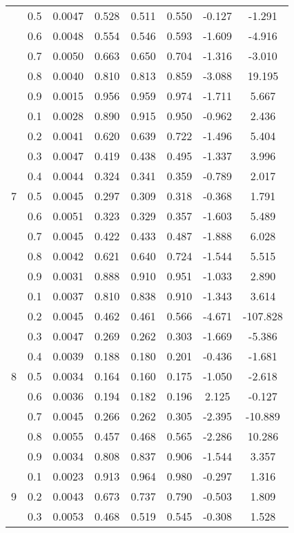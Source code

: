 \documentclass[11pt,a4paper]{report}
\begin{document}
\begin{longtable}{ | c | c || c | c | c | c | c | c | }
 & 0.5 & 0.0047 & 0.528 & 0.511 & 0.550 & -0.127 & -1.291 \\
 & 0.6 & 0.0048 & 0.554 & 0.546 & 0.593 & -1.609 & -4.916 \\
 & 0.7 & 0.0050 & 0.663 & 0.650 & 0.704 & -1.316 & -3.010 \\
 & 0.8 & 0.0040 & 0.810 & 0.813 & 0.859 & -3.088 & 19.195 \\
 & 0.9 & 0.0015 & 0.956 & 0.959 & 0.974 & -1.711 & 5.667 \\
 \hline
\multirow{9}{*}{7} & 0.1 & 0.0028 & 0.890 & 0.915 & 0.950 & -0.962 & 2.436 \\
 & 0.2 & 0.0041 & 0.620 & 0.639 & 0.722 & -1.496 & 5.404 \\
 & 0.3 & 0.0047 & 0.419 & 0.438 & 0.495 & -1.337 & 3.996 \\
 & 0.4 & 0.0044 & 0.324 & 0.341 & 0.359 & -0.789 & 2.017 \\
 & 0.5 & 0.0045 & 0.297 & 0.309 & 0.318 & -0.368 & 1.791 \\
 & 0.6 & 0.0051 & 0.323 & 0.329 & 0.357 & -1.603 & 5.489 \\
 & 0.7 & 0.0045 & 0.422 & 0.433 & 0.487 & -1.888 & 6.028 \\
 & 0.8 & 0.0042 & 0.621 & 0.640 & 0.724 & -1.544 & 5.515 \\
 & 0.9 & 0.0031 & 0.888 & 0.910 & 0.951 & -1.033 & 2.890 \\
 \hline
\multirow{9}{*}{8} & 0.1 & 0.0037 & 0.810 & 0.838 & 0.910 & -1.343 & 3.614 \\
 & 0.2 & 0.0045 & 0.462 & 0.461 & 0.566 & -4.671 & -107.828 \\
 & 0.3 & 0.0047 & 0.269 & 0.262 & 0.303 & -1.669 & -5.386 \\
 & 0.4 & 0.0039 & 0.188 & 0.180 & 0.201 & -0.436 & -1.681 \\
 & 0.5 & 0.0034 & 0.164 & 0.160 & 0.175 & -1.050 & -2.618 \\
 & 0.6 & 0.0036 & 0.194 & 0.182 & 0.196 & 2.125 & -0.127 \\
 & 0.7 & 0.0045 & 0.266 & 0.262 & 0.305 & -2.395 & -10.889 \\
 & 0.8 & 0.0055 & 0.457 & 0.468 & 0.565 & -2.286 & 10.286 \\
 & 0.9 & 0.0034 & 0.808 & 0.837 & 0.906 & -1.544 & 3.357 \\
 \hline
\multirow{9}{*}{9} & 0.1 & 0.0023 & 0.913 & 0.964 & 0.980 & -0.297 & 1.316 \\
 & 0.2 & 0.0043 & 0.673 & 0.737 & 0.790 & -0.503 & 1.809 \\
 & 0.3 & 0.0053 & 0.468 & 0.519 & 0.545 & -0.308 & 1.528 \\

\end{longtable}
\end{document}
